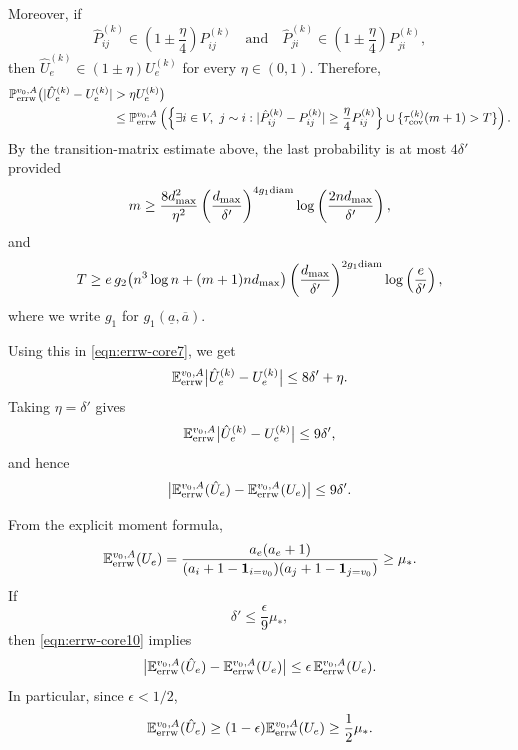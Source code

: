 \documentclass[a4paper, 11pt]{article}
\renewcommand{\P}{\mathbb{P}}
\newcommand{\E}{\mathbb{E}}
\newcommand{\Eerrw}{\E_{\textnormal{errw}}}
\newcommand{\Perrw}{\P_{\textnormal{errw}}}
\newcommand{\ind}{\mathbf{1}}
\newcommand{\diam}{\textnormal{diam}}
\newcommand{\cov}{\textnormal{cov}}
\begin{document}
Moreover, if
\[
\hat P_{ij}^{(k)}\in\left(1\pm\frac{\eta}4\right)P_{ij}^{(k)}
\quad\text{and}\quad
\hat P_{ji}^{(k)}\in\left(1\pm\frac{\eta}4\right)P_{ji}^{(k)},
\]
then $\hat U_e^{(k)}\in(1\pm\eta)U_e^{(k)}$ for every $\eta\in(0,1)$.
Therefore,
\begin{align*}
\Perrw^{v_0,A}\big(|\hat U_e^{(k)}-U_e^{(k)}| & >\eta U_e^{(k)}\big) \\
& \le
\Perrw^{v_0,A}\left(
\left\{\exists i\in V,\ j\sim i:
|\hat P_{ij}^{(k)}-P_{ij}^{(k)}|
\ge \frac{\eta}4 P_{ij}^{(k)}
\right\}
\cup
\{\tau_\cov^{(k)}(m+1)>T\}
\right).
\end{align*}
By the transition-matrix estimate above, the last probability is at most $4\delta'$ provided
\begin{equation}
\label{eqn:errw-mchoice}
m\ge
\frac{8d_{\max}^2}{\eta^2}
\left(\frac{d_{\max}}{\delta'}\right)^{4g_1\diam}
\log\left(\frac{2nd_{\max}}{\delta'}\right),
\end{equation}
and
\begin{equation}
\label{eqn:errw-Tchoice}
T\ge
e\,g_2\big(n^3\log n+(m+1)nd_{\max}\big)
\left(\frac{d_{\max}}{\delta'}\right)^{2g_1\diam}
\log\left(\frac{e}{\delta'}\right),
\end{equation}
where we write $g_1$ for $g_1(\underline a,\overline a)$.

Using this in \eqref{eqn:errw-core7}, we get
\[
\Eerrw^{v_0,A}\big|\hat U_e^{(k)}-U_e^{(k)}\big|
\le
8\delta'+\eta.
\]
Taking $\eta=\delta'$ gives
\[
\Eerrw^{v_0,A}\big|\hat U_e^{(k)}-U_e^{(k)}\big|\le9\delta',
\]
and hence
\begin{equation}
\label{eqn:errw-core10}
\big|\Eerrw^{v_0,A}(\hat U_e)-\Eerrw^{v_0,A}(U_e)\big|
\le9\delta'.
\end{equation}


From the explicit moment formula,
\begin{equation}
\label{eqn:errw-ue_lb}
\Eerrw^{v_0,A}(U_e)
=
\frac{a_e(a_e+1)}
{(a_i+1-\ind_{i=v_0})(a_j+1-\ind_{j=v_0})}
\ge
\mu_*.
\end{equation}
If
\begin{equation}
\label{eqn:errw-deltaprimecondition}
\delta'\le \frac{\epsilon}{9}\mu_*,
\end{equation}
then \eqref{eqn:errw-core10} implies
\begin{equation}
\label{eqn:errw-core-add1}
\big|\Eerrw^{v_0,A}(\hat U_e)-\Eerrw^{v_0,A}(U_e)\big|
\le
\epsilon\,\Eerrw^{v_0,A}(U_e).
\end{equation}
In particular, since $\epsilon<1/2$,
\[
\Eerrw^{v_0,A}(\hat U_e)
\ge
(1-\epsilon)\Eerrw^{v_0,A}(U_e)
\ge
\frac12\mu_*.
\]
\end{document}
